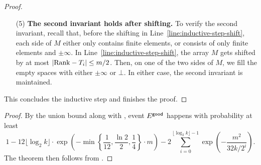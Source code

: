 \begin{proof}
\begin{enumerate}
    \item[(5)] \textbf{The second invariant holds after shifting.} To verify the second invariant, recall that, before the shifting in Line~\ref{line:inductive-step-shift}, each side of $M$ either only contains finite elements, or consists of only finite elements and $\pm\infty$. In Line~\ref{line:inductive-step-shift}, the array $M$ gets shifted by at most $|\mathrm{Rank} - T_i| \le m/2$. Then, on one of the two sides of $M$, we fill the empty spaces with either $\pm\infty$ or $\bot$. In either case, the second invariant is maintained.
    \end{enumerate}
    This concludes the inductive step and finishes the proof.
\end{proof}

\quantileexact*

\begin{proof}
By the union bound along with , event $E^{\textsf{good}}$ happens with probability at least
\[
    1- 12\lfloor\log_2 k \rfloor\cdot \exp\left(-\min\left\{\frac{1}{12},\frac{\ln 2}{2}, \frac{1}{4}\right\}\cdot m\right) - 2\sum_{i=0}^{\lfloor\log_2k\rfloor-1}\exp\left(-\frac{m^2}{32k/2^i}\right). 
\]
The theorem then follows from .
\end{proof}